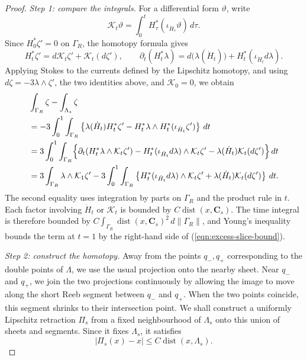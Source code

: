 \documentclass[11pt,a4paper]{article}
\numberwithin{equation}{section}
\theoremstyle{definition}
\theoremstyle{remark}
\newcommand{\dist}{\operatorname{dist}}
\newcommand{\dd}{\,d}
\begin{document}
\begin{proof}
		\smallskip
		\noindent\emph{Step 1: compare the integrals.}
		For a differential form $\vartheta$, write
		\[
		\mathcal K_t\vartheta
		=\int_0^t H_\tau^*(\iota_{\dot H_\tau}\vartheta)\,d\tau.
		\]
		Since $H_0^*\zeta'=0$ on $\Gamma_R$, the homotopy formula gives
		\[
		H_t^*\zeta'=d\mathcal K_t\zeta'+\mathcal K_t(d\zeta'),\qquad
		\partial_t(H_t^*\lambda)
		=d\bigl(\lambda(\dot H_t)\bigr)
		+H_t^*(\iota_{\dot H_t}d\lambda).
		\]
		Applying Stokes to the currents defined by the Lipschitz homotopy,
		and using $d\zeta=-3\lambda\wedge\zeta'$, the two identities above,
		and $\mathcal K_0=0$, we obtain
		\[
		\begin{aligned}
			&\int_{\Gamma_R}\zeta-\int_{\Lambda_s}\zeta\\
			&=-3\int_0^1\int_{\Gamma_R}
			\left\{\lambda(\dot H_t)H_t^*\zeta'
			-H_t^*\lambda\wedge H_t^*(\iota_{\dot H_t}\zeta')\right\}\,dt\\
			&=3\int_0^1\int_{\Gamma_R}
			\Bigl\{\partial_t(H_t^*\lambda\wedge\mathcal K_t\zeta')
			-H_t^*(\iota_{\dot H_t}d\lambda)\wedge\mathcal K_t\zeta'
			-\lambda(\dot H_t)\mathcal K_t(d\zeta')\Bigr\}\,dt\\
			&=3\int_{\Gamma_R}\lambda\wedge\mathcal K_1\zeta'
			-3\int_0^1\int_{\Gamma_R}
			\left\{H_t^*(\iota_{\dot H_t}d\lambda)\wedge\mathcal K_t\zeta'
			+\lambda(\dot H_t)\mathcal K_t(d\zeta')\right\}\,dt.
		\end{aligned}
		\]
		The second equality uses integration by parts on $\Gamma_R$ and the
		product rule in $t$.
		Each factor involving $\dot H_t$ or $\mathcal K_t$ is bounded by
		$C\dist(x,\mathbf C_s)$. The time integral is therefore bounded by
		$C\int_{\Gamma_R}\dist(x,\mathbf C_s)^2\dd\|\Gamma_R\|$, and Young's
		inequality bounds the term at $t=1$ by the right-hand side of
		(\ref{eqn:excess-slice-bound}).
		
		\smallskip
		\noindent\emph{Step 2: construct the homotopy.}
		Away from the points $q_-,q_+$ corresponding to the double points of
		$\Lambda$, we use the usual projection onto the nearby sheet.
		Near $q_-$ and $q_+$, we join the two projections continuously
		by allowing the image to move along the short Reeb segment between
		$q_-$ and $q_+$. When the two points coincide, this segment shrinks to
		their intersection point. We shall construct a uniformly Lipschitz
		retraction $\Pi_s$ from a fixed neighbourhood of $\Lambda_s$ onto this
		union of sheets and segments. Since it fixes $\Lambda_s$, it satisfies
		\[
		|\Pi_s(x)-x|\le C\dist(x,\Lambda_s).
		\]
		

\end{proof}
\end{document}
